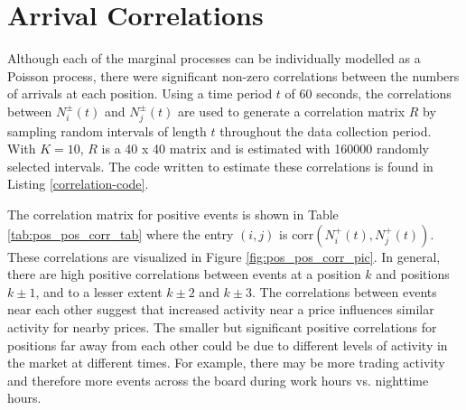\section{Arrival Correlations}\label{ch:correlations}
Although each of the marginal processes can be individually modelled as a Poisson process, there were significant non-zero correlations between the numbers of arrivals at each position. Using a time period $t$ of 60 seconds, the correlations between $N^{\pm}_i(t)$ and $N^{\pm}_j(t)$ are used to generate a correlation matrix $R$ by sampling random intervals of length $t$ throughout the data collection period. With $K=10$, $R$ is a 40 x 40 matrix and is estimated with 160000 randomly selected intervals. The code written to estimate these correlations is found in Listing \ref{correlation-code}.

The correlation matrix for positive events is shown in Table \ref{tab:pos_pos_corr_tab} where the entry $(i,j)$ is $\text{corr}(N^{+}_i(t), N^{+}_j(t))$. These correlations are visualized in Figure \ref{fig:pos_pos_corr_pic}. In general, there are high positive correlations between events at a position $k$ and positions $k \pm 1$, and to a lesser extent $k \pm 2$ and $k \pm 3$. The correlations between events near each other suggest that increased activity near a price influences similar activity for nearby prices. The smaller but significant positive correlations for positions far away from each other could be due to different levels of activity in the market at different times. For example, there may be more trading activity and therefore more events across the board during work hours vs. nighttime hours.

